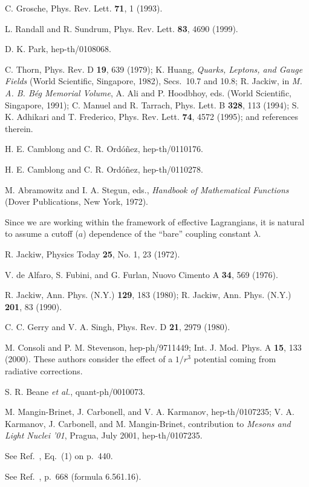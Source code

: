 \documentclass[a4paper,preprint,draft,showpacs,amsmath,amsfonts,amssymb,aps,prd]{revtex4}%
\begin{document}
\begin{thebibliography}{99}
C. Grosche, Phys. Rev. Lett. {\bf 71}, 1 (1993).

L. Randall and R. Sundrum, 
 Phys. Rev. Lett. {\bf 83},  4690 (1999).

D. K. 
Park, hep-th/0108068.

C. Thorn,
Phys. Rev. D {\bf 19}, 639 (1979);
K. Huang,
{\em Quarks, Leptons, and Gauge Fields\/}
(World Scientific, Singapore, 1982), Secs.\ 10.7 and 10.8;
R. Jackiw,
in {\em M. A. B. B\'{e}g Memorial Volume\/},
A. Ali and P. Hoodbhoy, eds. (World Scientific, Singapore, 1991);
C. Manuel and R. Tarrach, 
  Phys. Lett. B {\bf 328}, 113 (1994); %
S. K.  Adhikari and T. Frederico, 
 Phys. Rev. Lett. {\bf 74}, 4572  (1995); 
and references therein.

H. E. Camblong and C. R. Ord\'{o}\~{n}ez,
hep-th/0110176.

H. E. Camblong and C. R. Ord\'{o}\~{n}ez,
hep-th/0110278.

M. Abramowitz and I. A. Stegun, eds.,
{\em Handbook of Mathematical Functions\/}
(Dover Publications, New York, 1972).

Since we are working within the framework of effective Lagrangians, it
is natural to assume a cutoff ($a$) dependence of the ``bare'' 
coupling constant $\lambda$.

R. Jackiw, Physics Today {\bf 25}, No. 1, 23 (1972).

V. de Alfaro, S. Fubini, and G. Furlan, Nuovo Cimento A {\bf 34},
569 (1976).

R. Jackiw, Ann. Phys. (N.Y.) {\bf 129}, 183 (1980);
R. Jackiw, Ann. Phys. (N.Y.) {\bf 201}, 83 (1990).

C. C. Gerry and V. A. Singh,
Phys. Rev. D {\bf 21}, 2979 (1980).

M. Consoli and P. M. Stevenson,
hep-ph/9711449; Int. J. Mod. Phys. A {\bf 15}, 133 (2000).
These authors
consider the effect of a $1/r^{3}$ potential coming 
from radiative corrections.

S. R. Beane {\em et al.\/},
quant-ph/0010073.

M. Mangin-Brinet, J. Carbonell, and V. A. Karmanov,
hep-th/0107235;
V. A. Karmanov, J. Carbonell, and  M. Mangin-Brinet, 
contribution to {\em Mesons and Light Nuclei '01\/},
Pragua, July 2001,
hep-th/0107235.

See Ref.~\cite{wat:44},
Eq.~(1) on 
p.\ 440.

See Ref.~\cite{gra:00}, 
p.\ 668  (formula 6.561.16).
 
\end{thebibliography}
\end{document}
